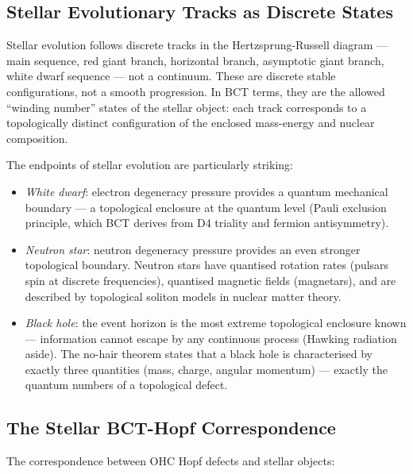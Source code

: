 \documentclass[aps,prl,preprint,superscriptaddress,floatfix]{revtex4-2}
\begin{document}
\subsection{Stellar Evolutionary Tracks as Discrete States}

Stellar evolution follows discrete tracks in the
Hertzsprung-Russell diagram --- main sequence, red giant branch,
horizontal branch, asymptotic giant branch, white dwarf sequence
--- not a continuum. These are discrete stable configurations,
not a smooth progression. In BCT terms, they are the allowed
``winding number'' states of the stellar object: each track
corresponds to a topologically distinct configuration of the
enclosed mass-energy and nuclear composition.

The endpoints of stellar evolution are particularly striking:
\begin{itemize}
\item \textit{White dwarf}: electron degeneracy pressure provides
  a quantum mechanical boundary --- a topological enclosure at the
  quantum level (Pauli exclusion principle, which BCT derives from
  D4 triality and fermion antisymmetry).
\item \textit{Neutron star}: neutron degeneracy pressure provides
  an even stronger topological boundary. Neutron stars have
  quantised rotation rates (pulsars spin at discrete frequencies),
  quantised magnetic fields (magnetars), and are described by
  topological soliton models in nuclear matter theory.
\item \textit{Black hole}: the event horizon is the most extreme
  topological enclosure known --- information cannot escape by
  any continuous process (Hawking radiation aside). The no-hair
  theorem states that a black hole is characterised by exactly
  three quantities (mass, charge, angular momentum) --- exactly
  the quantum numbers of a topological defect.
\end{itemize}

\subsection{The Stellar BCT-Hopf Correspondence}

The correspondence between OHC Hopf defects and stellar objects:
\end{document}
